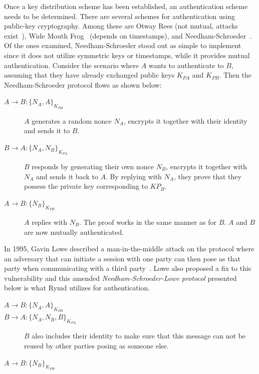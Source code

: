 Once a key distribution scheme has been established, an authentication scheme needs to be determined. There are several schemes for authentication using public-key cryptography. Among these are Otway Rees (not mutual, attacks exist~\cite{Wang:2000}), Wide Mouth Frog~\cite{Burrows:1990} (depends on timestamps), and Needham-Schroeder~\cite{Needham:1978}. Of the ones examined, Needham-Schroeder stood out as simple to implement since it does not utilize symmetric keys or timestamps, while it provides mutual authentication. Consider the scenario where $A$ wants to authenticate to $B$, assuming that they have already exchanged public keys $K_{PA}$ and $K_{PB}$. Then the Needham-Schroeder protocol flows as shown below:

\begin{description}
  \item[$A \rightarrow B: \{N_A, A\}_{K_{PB}}$] $A$ generates a random nonce $N_A$, encrypts it together with their identity and sends it to $B$.
  \item[$B \rightarrow A: \{N_A, N_B\}_{K_{PA}}$] $B$ responds by generating their own nonce $N_B$, encrypts it together with $N_A$ and sends it back to $A$. By replying with $N_A$, they prove that they possess the private key corresponding to $KP_B$.
  \item[$A \rightarrow B: \{N_B\}_{K_{PB}}$] $A$ replies with $N_B$. The proof works in the same manner as for $B$. $A$ and $B$ are now mutually authenticated.
\end{description}

In 1995, Gavin Lowe described a man-in-the-middle attack on the protocol where an adversary that can initiate a session with one party can then pose as that party when communicating with a third party~\cite{Lowe:1995}. Lowe also proposed a fix to this vulnerability and this amended \emph{Needham-Schroeder-Lowe protocol} presented below is what Rymd utilizes for authentication.

\begin{description}
  \item[$A \rightarrow B: \{N_A, A\}_{K_{PB}}$]
  \item[$B \rightarrow A: \{N_A, N_B, B\}_{K_{PA}}$] $B$ also includes their identity to make sure that this message can not be reused by other parties posing as someone else.
  \item[$A \rightarrow B: \{N_B\}_{K_{PB}}$]
\end{description}

